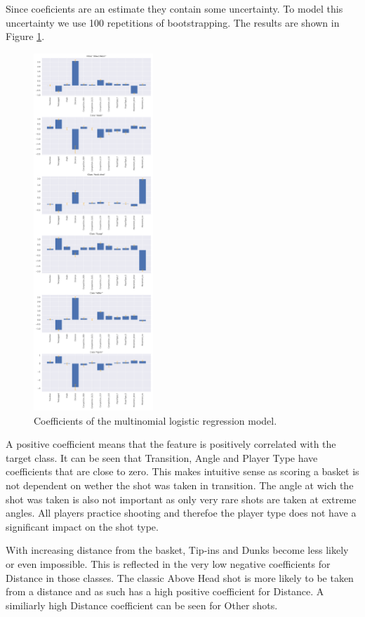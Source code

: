 \documentclass[9pt]{IEEEtran}
\begin{document}
Since coeficients are an estimate they contain some uncertainty.
To model this uncertainty we use 100 repetitions of bootstrapping.
The results are shown in Figure \ref{fig:coef}.
\begin{figure}
    \centering
    \includegraphics[width=0.4\textwidth]{coefficients.pdf}
    \caption{Coefficients of the multinomial logistic regression model.}
    \label{fig:coef}
\end{figure}
A positive coefficient means that the feature is positively correlated with the target class.
It can be seen that Transition, Angle and Player Type have coefficients that are close to zero.
This makes intuitive sense as scoring a basket is not dependent on wether the shot was taken in transition.
The angle at wich the shot was taken is also not important as only very rare shots are taken at extreme angles.
All players practice shooting and therefoe the player type does not have a significant impact on the shot type.

With increasing distance from the basket, Tip-ins and Dunks become less likely or even impossible.
This is reflected in the very low negative coefficients for Distance in those classes.
The classic Above Head shot is more likely to be taken from a distance and as such has a high positive coefficient for Distance.
A similiarly high Distance coefficient can be seen for Other shots.
\end{document}
